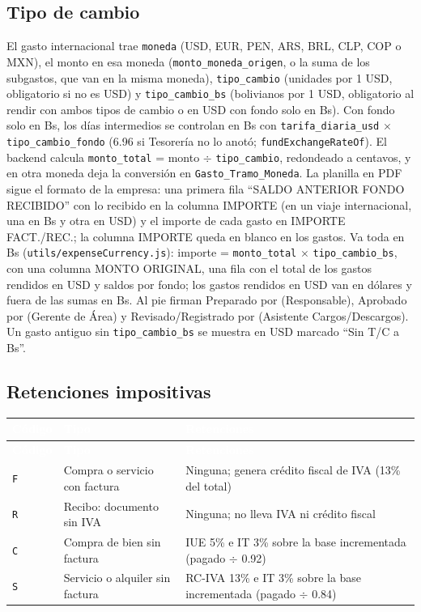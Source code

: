 \documentclass[11pt,letterpaper]{article}
\newcommand{\cabecera}{\rowcolor{maxamPrimario}}
\newcommand{\tth}[1]{\textcolor{white}{\textbf{#1}}}
\newcommand{\code}[1]{\nolinkurl{#1}}
\begin{document}
\subsection{Tipo de cambio}
El gasto internacional trae \code{moneda} (USD, EUR, PEN, ARS, BRL, CLP, COP o MXN), el monto en esa moneda (\code{monto_moneda_origen}, o la suma de los subgastos, que van en la misma moneda), \code{tipo_cambio} (unidades por 1 USD, obligatorio si no es USD) y \code{tipo_cambio_bs} (bolivianos por 1 USD, obligatorio al rendir con ambos tipos de cambio o en USD con fondo solo en Bs). Con fondo solo en Bs, los días intermedios se controlan en Bs con \code{tarifa_diaria_usd} $\times$ \code{tipo_cambio_fondo} (6.96 si Tesorería no lo anotó; \code{fundExchangeRateOf}). El backend calcula \code{monto_total} = monto $\div$ \code{tipo_cambio}, redondeado a centavos, y en otra moneda deja la conversión en \code{Gasto_Tramo_Moneda}. La planilla en PDF sigue el formato de la empresa: una primera fila ``SALDO ANTERIOR FONDO RECIBIDO'' con lo recibido en la columna IMPORTE (en un viaje internacional, una en Bs y otra en USD) y el importe de cada gasto en IMPORTE FACT./REC.; la columna IMPORTE queda en blanco en los gastos. Va toda en Bs (\code{utils/expenseCurrency.js}): importe = \code{monto_total} $\times$ \code{tipo_cambio_bs}, con una columna MONTO ORIGINAL, una fila con el total de los gastos rendidos en USD y saldos por fondo; los gastos rendidos en USD van en dólares y fuera de las sumas en Bs. Al pie firman Preparado por (Responsable), Aprobado por (Gerente de Área) y Revisado/Registrado por (Asistente Cargos/Descargos). Un gasto antiguo sin \code{tipo_cambio_bs} se muestra en USD marcado ``Sin T/C a Bs''.

\subsection{Retenciones impositivas}
\begin{xltabular}{\textwidth}{L{1.4cm} L{5.2cm} Y}
\cabecera \tth{Código} & \tth{Tipo} & \tth{Retenciones} \\
\endfirsthead
\cabecera \tth{Código} & \tth{Tipo} & \tth{Retenciones} \\
\endhead
{} \code{F} & Compra o servicio con factura & Ninguna; genera crédito fiscal de IVA (13\% del total) \\
\code{R} & Recibo: documento sin IVA & Ninguna; no lleva IVA ni crédito fiscal \\
 \code{C} & Compra de bien sin factura & IUE 5\% e IT 3\% sobre la base incrementada (pagado $\div$ 0.92) \\
\code{S} & Servicio o alquiler sin factura & RC-IVA 13\% e IT 3\% sobre la base incrementada (pagado $\div$ 0.84) \\
\end{xltabular}
\end{document}
